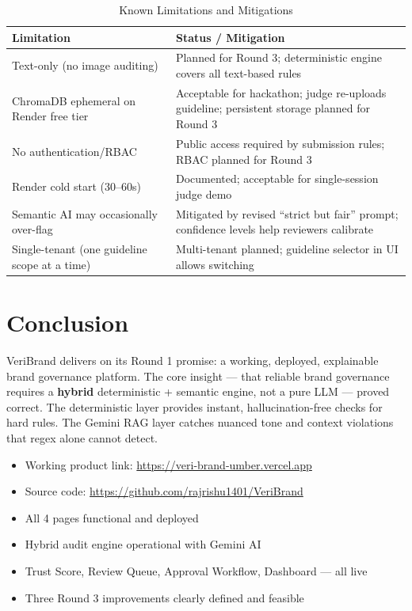 \documentclass[11pt,a4paper]{article}
\begin{document}
\begin{table}[H]
\centering
\begin{tabular}{p{} p{}}
\toprule
\textbf{Limitation} & \textbf{Status / Mitigation} \\
\midrule
Text-only (no image auditing) & Planned for Round 3; deterministic engine covers all text-based rules \\
\addlinespace
ChromaDB ephemeral on Render free tier & Acceptable for hackathon; judge re-uploads guideline; persistent storage planned for Round 3 \\
\addlinespace
No authentication/RBAC & Public access required by submission rules; RBAC planned for Round 3 \\
\addlinespace
Render cold start (30--60s) & Documented; acceptable for single-session judge demo \\
\addlinespace
Semantic AI may occasionally over-flag & Mitigated by revised ``strict but fair'' prompt; confidence levels help reviewers calibrate \\
\addlinespace
Single-tenant (one guideline scope at a time) & Multi-tenant planned; guideline selector in UI allows switching \\
\bottomrule
\end{tabular}
\caption{Known Limitations and Mitigations}
\end{table}

\section{Conclusion}

VeriBrand delivers on its Round 1 promise: a working, deployed, explainable brand governance platform. The core insight --- that reliable brand governance requires a \textbf{hybrid} deterministic + semantic engine, not a pure LLM --- proved correct. The deterministic layer provides instant, hallucination-free checks for hard rules. The Gemini RAG layer catches nuanced tone and context violations that regex alone cannot detect.

\begin{tcolorbox}[colback=successgreen!10, colframe=successgreen, arc=2mm, boxrule=0.5pt, title=\textbf{Round 2 Delivery Summary}]
\begin{itemize}[nosep]
    \item Working product link: \url{https://veri-brand-umber.vercel.app}
    \item Source code: \url{https://github.com/rajrishu1401/VeriBrand}
    \item All 4 pages functional and deployed
    \item Hybrid audit engine operational with Gemini AI
    \item Trust Score, Review Queue, Approval Workflow, Dashboard --- all live
    \item Three Round 3 improvements clearly defined and feasible
\end{itemize}
\end{tcolorbox}
\end{document}
